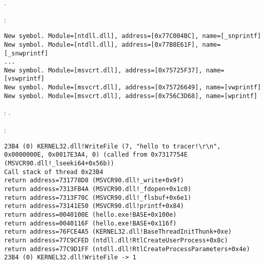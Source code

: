  .

 :

\begin{lstlisting}
New symbol. Module=[ntdll.dll], address=[0x77C004BC], name=[_snprintf]
New symbol. Module=[ntdll.dll], address=[0x77B8E61F], name=[_snwprintf]
...
New symbol. Module=[msvcrt.dll], address=[0x75725F37], name=[vswprintf]
New symbol. Module=[msvcrt.dll], address=[0x75726649], name=[vwprintf]
New symbol. Module=[msvcrt.dll], address=[0x756C3D68], name=[wprintf]
\end{lstlisting}

: .

\forexample{}


:

\begin{lstlisting}
23B4 (0) KERNEL32.dll!WriteFile (7, "hello to tracer!\r\n", 0x0000000E, 0x0017E3A4, 0) (called from 0x7317754E (MSVCR90.dll!_lseeki64+0x56b))
Call stack of thread 0x23B4
return address=731778D8 (MSVCR90.dll!_write+0x9f)
return address=7313FB4A (MSVCR90.dll!_fdopen+0x1c0)
return address=7313F70C (MSVCR90.dll!_flsbuf+0x6e1)
return address=73141E50 (MSVCR90.dll!printf+0x84)
return address=0040100E (hello.exe!BASE+0x100e)
return address=0040116F (hello.exe!BASE+0x116f)
return address=76FCE4A5 (KERNEL32.dll!BaseThreadInitThunk+0xe)
return address=77C9CFED (ntdll.dll!RtlCreateUserProcess+0x8c)
return address=77C9D1FF (ntdll.dll!RtlCreateProcessParameters+0x4e)
23B4 (0) KERNEL32.dll!WriteFile -> 1
\end{lstlisting}



